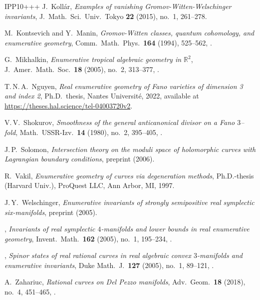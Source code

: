 \begin{thebibliography}{IPP{\etalchar{+}}10+++}
J.~Koll\'{a}r, \emph{Examples of vanishing {G}romov-{W}itten-{W}elschinger
  invariants}, J.~Math.\ Sci.\ Univ.\ Tokyo \textbf{22} (2015), no.~1, 261--278.

M.~Kontsevich and Y.~Manin, \emph{Gromov-{W}itten classes, quantum cohomology,
  and enumerative geometry}, Comm.\ Math.\ Phys.\ \textbf{164} (1994), 525--562,
.

G.~Mikhalkin, \emph{Enumerative tropical algebraic geometry in $\mathbb{R}^2$},
  J.~Amer.\ Math.\ Soc.\ \textbf{18} (2005), no.~2, 313--377, 
.

  T.\,N.\,A.~Nguyen, \emph{Real enumerative geometry of {F}ano varieties of dimension 3 and index 2}, Ph.D.~thesis, Nantes Universit{\'e}, 2022, available at \url{https://theses.hal.science/tel-04003720v2}.

V.\,V.~Shokurov, \emph{Smoothness of the general anticanonical divisor on a
  {F}ano $3$--fold}, Math.\ USSR-Izv.\ \textbf{14} (1980),
  no.~2, 395--405, 
.

J.\,P.~Solomon, \emph{Intersection theory on the moduli space of holomorphic
  curves with Lagrangian boundary conditions}, preprint 
  (2006).

R.~Vakil, \emph{Enumerative geometry of curves via degeneration methods},
Ph.D.-thesis (Harvard Univ.), ProQuest LLC, Ann Arbor, MI, 1997.

J.\,Y.~Welschinger, \emph{Enumerative invariants of strongly semipositive real
  symplectic six-manifolds}, preprint  (2005).

\bysame, \emph{Invariants of real symplectic $4$-manifolds and lower bounds in
  real enumerative geometry}, Invent.\ Math.\ \textbf{162} (2005),
  no.~1, 195--234, 
.

\bysame, \emph{Spinor states of real rational curves in real algebraic convex
  $3$-manifolds and enumerative invariants}, Duke Math.~J.\
  \textbf{127} (2005), no.~1, 89--121, 
.

A.~Zahariuc, \emph{Rational curves on {D}el {P}ezzo manifolds}, Adv.\
Geom.\ \textbf{18} (2018), no.~4, 451--465, 
\doi{10.1515/advgeom-2018-0010}.

\end{thebibliography}

